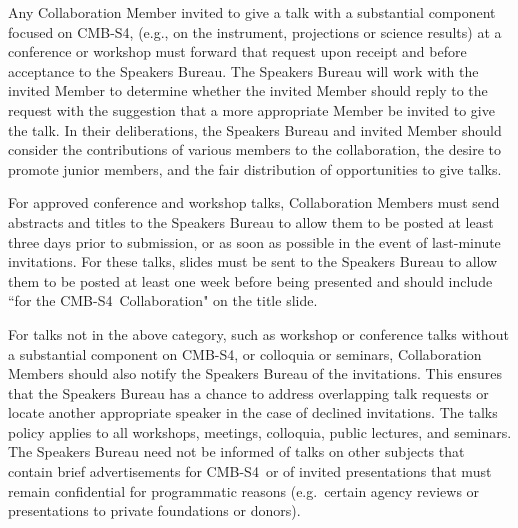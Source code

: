 \documentclass[12pt]{article}
\newcommand\collabname{CMB-S4}
\begin{document}
{\color{\markcolor}
Any Collaboration Member invited to give a talk with a substantial component focused on \collabname, (e.g., on the instrument, projections or science results) at a conference or workshop must forward that request upon receipt and before acceptance to the Speakers Bureau.  The Speakers Bureau will work with the invited Member to determine whether the invited Member should reply to the request with the suggestion that a more appropriate Member be invited to give the talk. In their deliberations, the Speakers Bureau and invited Member should consider
the contributions of various members to the collaboration, the desire to promote junior members, and the fair distribution of opportunities to give talks.

For approved conference and workshop talks, Collaboration Members must send abstracts and titles to the Speakers Bureau to allow them to be posted at least three days prior to submission, or as soon as possible in the event of last-minute invitations. For these talks, slides must be sent to the Speakers Bureau to allow them to be posted at least one week before being presented and should include ``for the \collabname\ Collaboration" on the title slide. %

For talks not in the above category, such as workshop or conference talks without a substantial component on \collabname, or colloquia or seminars, Collaboration Members should also notify the Speakers Bureau of the 
invitations. %
This ensures that the Speakers Bureau has a chance to address overlapping talk requests or locate another appropriate speaker in the case of declined invitations.  The talks policy applies to all workshops, meetings, colloquia, public lectures, and seminars.  The Speakers Bureau need not be informed of talks on other subjects that contain brief advertisements for \collabname\  or of invited presentations that must remain confidential for programmatic reasons (e.g.~certain agency reviews or presentations to private foundations or donors).

}
\end{document}
